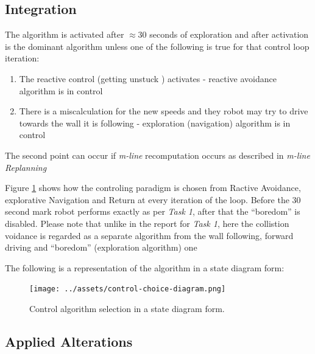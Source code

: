\documentclass[11pt, a4paper]{article}
\begin{document}

\subsection{Integration}

The algorithm is activated after $\approx 30$ seconds of exploration\cite{task1_report} and after
activation is the dominant algorithm unless one of the following is true for that control loop iteration:

\begin{enumerate}	

	\item The reactive control (getting unstuck \cite{task1_report}) activates - reactive avoidance algorithm is in control
	\item There is a miscalculation for the new speeds and they robot may try to drive towards the wall it is following - exploration (navigation) algorithm is in control

\end{enumerate}

The second point can occur if \textit{m-line} recomputation occurs as described in \textit{m-line Replanning}

Figure \ref{controlflow} shows how the controling paradigm is chosen from Ractive Avoidance, 
explorative Navigation and Return at every iteration of the loop. Before the 30 second mark robot
performs exactly as per \textit{Task 1}, after that the ``boredom''\cite{task1_report} is disabled. 
Please note that unlike in the report for \textit{Task 1}, here the collistion voidance is regarded
as a separate algorithm from the wall following, forward driving and ``boredom'' (exploration algorithm) one

The following is a representation of the algorithm in a state diagram form:
\begin{figure}[H]
  \begin{center}
    \texttt{[image: ../assets/control-choice-diagram.png]}
    \caption{\label{controlflow}Control algorithm selection in a state diagram form.}
  \end{center}
\end{figure} 



\subsection{Applied Alterations}
\label{Needed Alterations}
\end{document}
